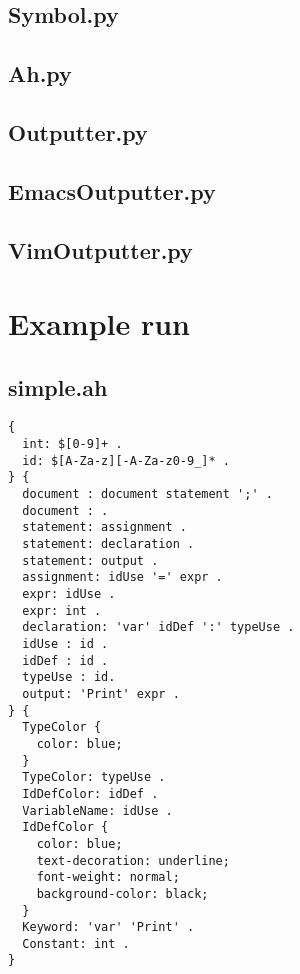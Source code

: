 \documentclass[]{article}
\begin{document}
  \subsection{Symbol.py}
  
  \subsection{Ah.py}
  
  \subsection{Outputter.py}
  
  \subsection{EmacsOutputter.py}
  
  \subsection{VimOutputter.py}
  

  \section{Example run}

  \subsection{simple.ah}
  \lstset{language=}
  \begin{lstlisting}
{
  int: $[0-9]+ .
  id: $[A-Za-z][-A-Za-z0-9_]* .
} {
  document : document statement ';' .
  document : .
  statement: assignment .
  statement: declaration .
  statement: output .
  assignment: idUse '=' expr .
  expr: idUse .
  expr: int .
  declaration: 'var' idDef ':' typeUse .
  idUse : id .
  idDef : id .
  typeUse : id.
  output: 'Print' expr .
} {
  TypeColor {
    color: blue;
  }
  TypeColor: typeUse .
  IdDefColor: idDef .
  VariableName: idUse .
  IdDefColor {
    color: blue;
    text-decoration: underline;
    font-weight: normal;
    background-color: black;
  }
  Keyword: 'var' 'Print' .
  Constant: int .
}
  \end{lstlisting}
\end{document}
